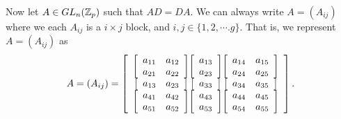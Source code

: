 \documentclass[11pt, titlepage, a4paper]{article}
\begin{document}
Now let $A \in GL_{n}(\mathbb{Z}_{p})$ such that $AD=DA.$ We can always write $A = (A_{ij})$ where we each $A_{ij}$ is a $i\times j$ block, and $i,j \in \{1,2,\cdots. g\}.$ That is, we represent $A = (A_{ij})$ as 
\begin{align*}
A = (A_{ij})= \left[ 
\begin{array}{c@{}c@{}c}
 \left[\begin{array}{cc}
         a_{11} & a_{12} \\
         a_{21} & a_{22} \\
  \end{array}\right] &\left[\begin{array}{cc} a_{13} \\ 
  							a_{23} \end{array}\right] & \left[\begin{array}{cc}
         a_{14} & a_{15} \\
         a_{24} & a_{25} \\
  \end{array}\right] \\
\left[\begin{array}{ccc}
                       a_{13} & a_{23}\\
                      \end{array}\right] & \left[\begin{array}{ccc}
                       a_{33}\\
                      \end{array}\right] &\left[\begin{array}{ccc}
                       a_{34} & a_{35}\\
                      \end{array}\right] \\
 \left[\begin{array}{cc}
         a_{41} & a_{42} \\
         a_{51} & a_{52} \\
  \end{array}\right] &\left[\begin{array}{cc} a_{43} \\ 
  							a_{53} \end{array}\right] & \left[\begin{array}{cc}
         a_{44} & a_{45} \\
         a_{54} & a_{55} \\
  \end{array}\right]
\end{array}\right].
\end{align*}
\end{document}
